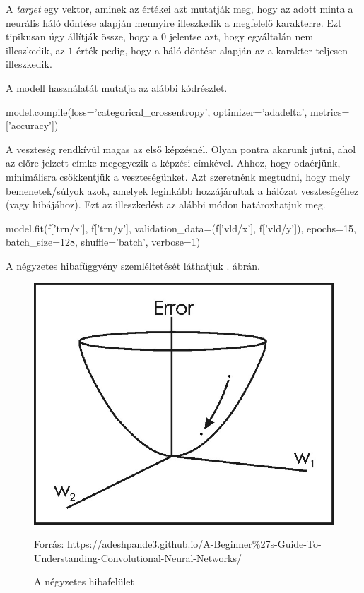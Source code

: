 A \textit{target} egy vektor, aminek az értékei azt mutatják meg, hogy az adott minta a neurális háló döntése alapján mennyire illeszkedik a megfelelő karakterre. Ezt tipikusan úgy állítják össze, hogy a $0$ jelentse azt, hogy egyáltalán nem illeszkedik, az $1$ érték pedig, hogy a háló döntése alapján az a karakter teljesen illeszkedik.

A modell használatát mutatja az alábbi kódrészlet.
\begin{python}
model.compile(loss='categorical_crossentropy',
              optimizer='adadelta',
              metrics=['accuracy'])
\end{python}

A veszteség rendkívül magas az első képzésnél. Olyan pontra akarunk jutni, ahol az előre jelzett címke megegyezik a képzési címkével. Ahhoz, hogy odaérjünk, minimálisra csökkentjük a veszteségünket. Azt szeretnénk megtudni, hogy mely bemenetek/súlyok azok, amelyek leginkább hozzájárultak a hálózat veszteségéhez (vagy hibájához). Ezt az illeszkedést az alábbi módon határozhatjuk meg.

\begin{python}
model.fit(f['trn/x'], f['trn/y'],	
	validation_data=(f['vld/x'], f['vld/y']),
	epochs=15, batch_size=128,
	shuffle='batch', verbose=1)
\end{python}

A négyzetes hibafüggvény szemléltetését láthatjuk . ábrán.

\begin{figure}[h]
\centering
\includegraphics[scale=0.4]{images/CNN_loss}
\caption{A négyzetes hibafelület}
Forrás: \url{https://adeshpande3.github.io/A-Beginner%27s-Guide-To-Understanding-Convolutional-Neural-Networks/}
\label{fig:CNN_loss}
\end{figure}

